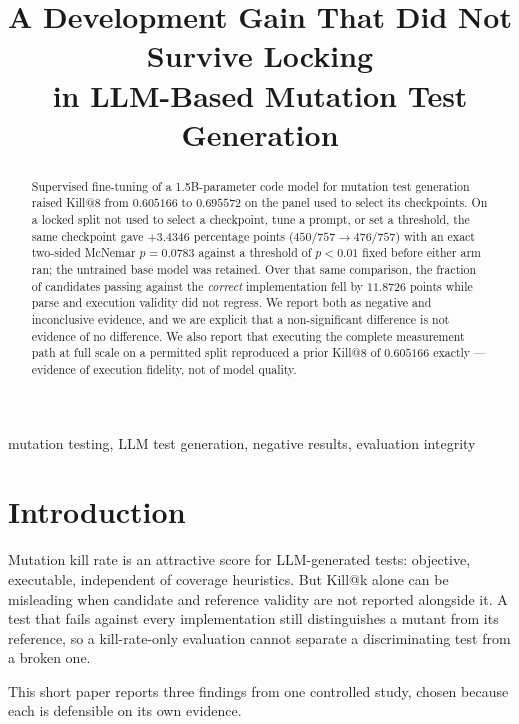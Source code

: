 \documentclass[10pt,conference]{IEEEtran}
\makeatletter
\newcommand{\killk}[1]{Kill@#1}
\makeatother
\begin{document}
\title{A Development Gain That Did Not Survive Locking\\
in LLM-Based Mutation Test Generation}

\author{\IEEEauthorblockN{}\IEEEauthorblockA{}}

\maketitle

\begin{abstract}
Supervised fine-tuning of a 1.5B-parameter code model for mutation test
generation raised \killk{8} from $0.605166$ to $0.695572$ on the panel used to
select its checkpoints. On a locked split not used to select a checkpoint, tune
a prompt, or set a threshold, the same checkpoint gave $+3.4346$ percentage points ($450/757 \to 476/757$) with an
exact two-sided McNemar $p = 0.0783$ against a threshold of $p < 0.01$ fixed
before either arm ran; the untrained base model was retained. Over that same
comparison, the fraction of candidates passing against the \emph{correct}
implementation fell by $11.8726$ points while parse and execution validity did
not regress. We report both as negative and inconclusive evidence, and we are
explicit that a non-significant difference is not evidence of no difference. We
also report that executing the complete measurement path at full scale on a
permitted split reproduced a prior \killk{8} of $0.605166$ exactly --- evidence
of execution fidelity, not of model quality.
\end{abstract}

\begin{IEEEkeywords}
mutation testing, LLM test generation, negative results, evaluation integrity
\end{IEEEkeywords}

\section{Introduction}

Mutation kill rate is an attractive score for LLM-generated tests: objective,
executable, independent of coverage heuristics. But \killk{k} alone can be
misleading when candidate and reference validity are not reported alongside it.
A test that fails against every implementation still distinguishes a mutant from
its reference, so a kill-rate-only evaluation cannot separate a discriminating
test from a broken one.

This short paper reports three findings from one controlled study, chosen
because each is defensible on its own evidence.
\end{document}
